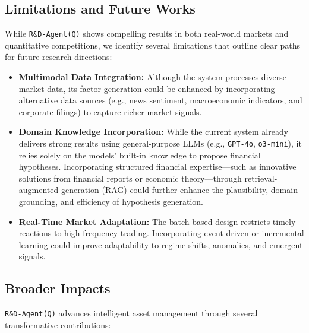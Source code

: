\documentclass{article}
\newcommand{\name}{\texttt{R\&D-Agent(Q)}}
\begin{document}
\subsection{Limitations and Future Works} \label{app:limitation}
While \texttt{\name} shows compelling results in both real-world markets and quantitative competitions, we identify several limitations that outline clear paths for future research directions:
\begin{itemize}[leftmargin=4ex]
    \item \textbf{Multimodal Data Integration:} Although the system processes diverse market data, its factor generation could be enhanced by incorporating alternative data sources (e.g., news sentiment, macroeconomic indicators, and corporate filings) to capture richer market signals.
    
    \item \textbf{Domain Knowledge Incorporation:} While the current system already delivers strong results using general-purpose LLMs (e.g., \texttt{GPT-4o}, \texttt{o3-mini}), it relies solely on the models' built-in knowledge to propose financial hypotheses. Incorporating structured financial expertise—such as innovative solutions from financial reports or economic theory—through retrieval-augmented generation (RAG) could further enhance the plausibility, domain grounding, and efficiency of hypothesis generation.
    
    \item \textbf{Real-Time Market Adaptation:} The batch-based design restricts timely reactions to high-frequency trading. Incorporating event-driven or incremental learning could improve adaptability to regime shifts, anomalies, and emergent signals.
\end{itemize}

\subsection{Broader Impacts}
\label{app:implications}
\texttt{\name} advances intelligent asset management through several transformative contributions:
\end{document}

